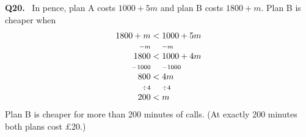 \documentclass[12pt,a4paper]{article}
\newcommand{\wq}[1]{\par\addvspace{6pt}\noindent\textbf{Q#1.}\ }
\newcommand{\op}[1]{{\scriptstyle #1}}
\begin{document}
\wq{20} In pence, plan A costs $1000+5m$ and plan B costs $1800+m$. Plan B is cheaper when
\[
\begin{array}{r@{\;}c@{\;}l}
  1800+m & < & 1000+5m\\
  \op{-m} & & \op{-m}\\
  1800 & < & 1000+4m\\
  \op{-1000} & & \op{-1000}\\
  800 & < & 4m\\
  \op{\div4} & & \op{\div4}\\
  200 & < & m
\end{array}
\]
Plan B is cheaper for more than 200 minutes of calls. (At exactly 200 minutes both plans cost £20.)
\end{document}
